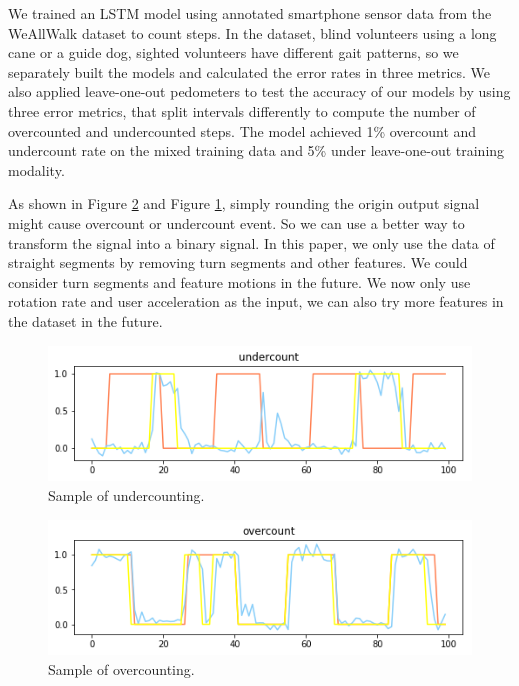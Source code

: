 \documentclass[11pt]{article}
\begin{document}
We trained an LSTM model using annotated smartphone sensor data from the WeAllWalk dataset to count steps. In the dataset, blind volunteers using a long cane or a guide dog, sighted volunteers have different gait patterns, so we separately built the models and calculated the error rates in three metrics. We also applied leave-one-out pedometers to test the accuracy of our models by using three error metrics, that split intervals differently to compute the number of overcounted and undercounted steps. The model achieved 1\% overcount and undercount rate on the mixed training data and 5\% under leave-one-out training modality.

As shown in Figure \ref{fig:overcount} and Figure \ref{fig:undercount}, simply rounding the origin output signal might cause overcount or undercount event. So we can use a better way to transform the signal into a binary signal. In this paper, we only use the data of straight segments by removing turn segments and other features. We could consider turn segments and feature motions in the future. We now only use rotation rate and user acceleration as the input, we can also try more features in the dataset in the future.

\begin{figure}[ht]
\centering
\includegraphics[scale=0.4]{undercount}
\caption{Sample of undercounting.}
\label{fig:undercount}
\end{figure}

\begin{figure}[ht]
\centering
\includegraphics[scale=0.4]{overcount}
\caption{Sample of overcounting.}
\label{fig:overcount}
\end{figure}
\end{document}
